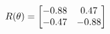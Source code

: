 \documentclass[preview]{standalone}
\begin{document}
\begin{align*}
\special{dvisvgm:raw <g id='unique000'>}R(\theta) = \begin{bmatrix}-0.88 & 0.47\\-0.47 & -0.88\end{bmatrix}\special{dvisvgm:raw </g>}
\end{align*}
\end{document}

